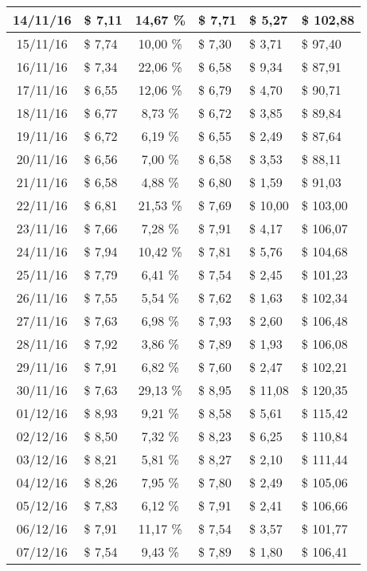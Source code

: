\begin{center}
\begin{small}
\begin{longtable}{|c|l|c|l|l|l|}
14/11/16 & \$ 7,11 & 14,67 \% & \$ 7,71 & \$ 5,27 & \$ 102,88 \\ \hline
15/11/16 & \$ 7,74 & 10,00 \% & \$ 7,30 & \$ 3,71 & \$ 97,40 \\ \hline
16/11/16 & \$ 7,34 & 22,06 \% & \$ 6,58 & \$ 9,34 & \$ 87,91 \\ \hline
17/11/16 & \$ 6,55 & 12,06 \% & \$ 6,79 & \$ 4,70 & \$ 90,71 \\ \hline
18/11/16 & \$ 6,77 & 8,73 \% & \$ 6,72 & \$ 3,85 & \$ 89,84 \\ \hline
19/11/16 & \$ 6,72 & 6,19 \% & \$ 6,55 & \$ 2,49 & \$ 87,64 \\ \hline
20/11/16 & \$ 6,56 & 7,00 \% & \$ 6,58 & \$ 3,53 & \$ 88,11 \\ \hline
21/11/16 & \$ 6,58 & 4,88 \% & \$ 6,80 & \$ 1,59 & \$ 91,03 \\ \hline
22/11/16 & \$ 6,81 & 21,53 \% & \$ 7,69 & \$ 10,00 & \$ 103,00 \\ \hline
23/11/16 & \$ 7,66 & 7,28 \% & \$ 7,91 & \$ 4,17 & \$ 106,07 \\ \hline
24/11/16 & \$ 7,94 & 10,42 \% & \$ 7,81 & \$ 5,76 & \$ 104,68 \\ \hline
25/11/16 & \$ 7,79 & 6,41 \% & \$ 7,54 & \$ 2,45 & \$ 101,23 \\ \hline
26/11/16 & \$ 7,55 & 5,54 \% & \$ 7,62 & \$ 1,63 & \$ 102,34 \\ \hline
27/11/16 & \$ 7,63 & 6,98 \% & \$ 7,93 & \$ 2,60 & \$ 106,48 \\ \hline
28/11/16 & \$ 7,92 & 3,86 \% & \$ 7,89 & \$ 1,93 & \$ 106,08 \\ \hline
29/11/16 & \$ 7,91 & 6,82 \% & \$ 7,60 & \$ 2,47 & \$ 102,21 \\ \hline
30/11/16 & \$ 7,63 & 29,13 \% & \$ 8,95 & \$ 11,08 & \$ 120,35 \\ \hline
01/12/16 & \$ 8,93 & 9,21 \% & \$ 8,58 & \$ 5,61 & \$ 115,42 \\ \hline
02/12/16 & \$ 8,50 & 7,32 \% & \$ 8,23 & \$ 6,25 & \$ 110,84 \\ \hline
03/12/16 & \$ 8,21 & 5,81 \% & \$ 8,27 & \$ 2,10 & \$ 111,44 \\ \hline
04/12/16 & \$ 8,26 & 7,95 \% & \$ 7,80 & \$ 2,49 & \$ 105,06 \\ \hline
05/12/16 & \$ 7,83 & 6,12 \% & \$ 7,91 & \$ 2,41 & \$ 106,66 \\ \hline
06/12/16 & \$ 7,91 & 11,17 \% & \$ 7,54 & \$ 3,57 & \$ 101,77 \\ \hline
07/12/16 & \$ 7,54 & 9,43 \% & \$ 7,89 & \$ 1,80 & \$ 106,41 \\ \hline

\end{longtable}
\end{small}
\end{center}
